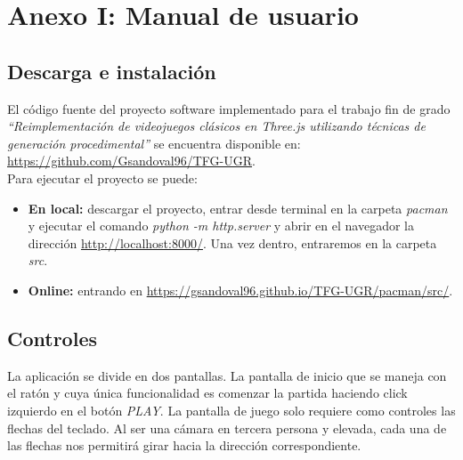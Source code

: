 
{}
\section*{Anexo I: Manual de usuario}

{}
\subsection*{Descarga e instalación}

El código fuente del proyecto software implementado para el trabajo fin de grado \textit{``Reimplementación de videojuegos clásicos en Three.js utilizando técnicas de generación procedimental''} se encuentra disponible en: 	\href{https://github.com/Gsandoval96/TFG-UGR}{https://github.com/Gsandoval96/TFG-UGR}.\\

Para ejecutar el proyecto se puede:

\begin{itemize}
    \item \textbf{En local:} descargar el proyecto, entrar desde terminal en la carpeta \textit{pacman} y ejecutar el comando \textit{python -m http.server} y abrir en el navegador la dirección \href{http://localhost:8000/}{http://localhost:8000/}. Una vez dentro, entraremos en la carpeta \textit{src}.
    \item \textbf{Online:} entrando en \href{https://gsandoval96.github.io/TFG-UGR/pacman/src/}{https://gsandoval96.github.io/TFG-UGR/pacman/src/}.
\end{itemize}

{}
\subsection*{Controles}

La aplicación se divide en dos pantallas. La pantalla de inicio que se maneja con el ratón y cuya única funcionalidad es comenzar la partida haciendo click izquierdo en el botón \textit{PLAY}. La pantalla de juego solo requiere como controles las flechas del teclado. Al ser una cámara en tercera persona y elevada, cada una de las flechas nos permitirá girar hacia la dirección correspondiente.


\newpage

\printglossary[title=Anexo II: Glosario, type=\acronymtype]
